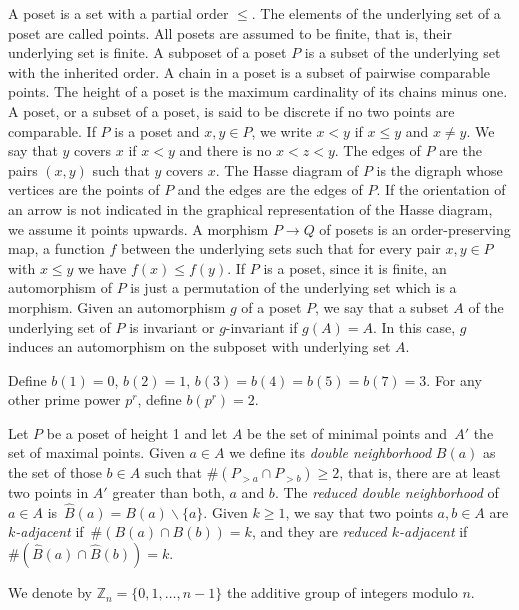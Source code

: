 \documentclass[ALCO,published]{cedram}
\newcommand{\Z}{\mathbb{Z}}
\begin{document}
A poset is a set with a partial order $\le$. The elements of the underlying set of a poset are called points. All posets are assumed to be finite, that is, their underlying set is finite. A subposet of a poset $P$ is a subset of the underlying set with the inherited order. A chain in a poset is a subset of pairwise comparable points. The height of a poset is the maximum cardinality of its chains minus one. A poset, or a subset of a poset, is said to be discrete if no two points are comparable. If $P$ is a poset and $x,y\in P$, we write $x<y$ if $x\le y$ and $x\neq y$. We say that $y$ covers $x$ if $x<y$ and there is no $x<z<y$. The edges of $P$ are the pairs $(x,y)$ such that $y$ covers $x$. The Hasse diagram of $P$ is the digraph whose vertices are the points of $P$ and the edges are the edges of $P$. If the orientation of an arrow is not indicated in the graphical representation of the Hasse diagram, we assume it points upwards. A morphism $P\to Q$ of posets is an order-preserving map, \ie a function $f$ between the underlying sets such that for every pair $x,y\in P$ with $x\le y$ we have $f(x)\le f(y)$. If $P$ is a poset, since it is finite, an automorphism of $P$ is just a permutation of the underlying set which is a morphism. Given an automorphism $g$ of a poset $P$, we say that a subset $A$ of the underlying set of $P$ is invariant or $g$-invariant if $g(A)=A$. In this case, $g$ induces an automorphism on the subposet with underlying set $A$.  

\begin{defi}
Define $b(1)=0$, $b(2)=1$, $b(3)=b(4)=b(5)=b(7)=3$. For any other prime power $p^r$, define $b(p^r)=2$. 
\end{defi}

\begin{defi}
Let $P$ be a poset of height 1 and let $A$ be the set of minimal points and~$A'$ the set of maximal points. Given $a\in A$ we define its \emph{double neighborhood} $B(a)$ as the set of those $b \in A$ such that $\# (P_{> a}\cap P_{> b}) \ge 2$, that is, there are at least two points in $A'$ greater than both, $a$ and $b$. The \emph{reduced double neighborhood} of $a\in A$ is~$\hat{B}(a)=B(a)\smallsetminus \{a\}$. Given $k\ge 1$, we say that two points $a,b\in A$ are \emph{$k$-adjacent} if~$\#(B(a)\cap B(b))=k$, and they are \emph{reduced $k$-adjacent} if~$\#(\hat{B}(a)\cap \hat{B}(b))=k$.
\end{defi}

We denote by $\Z_n=\{0,1,\ldots, n-1\}$ the additive group of integers modulo $n$.
\end{document}
